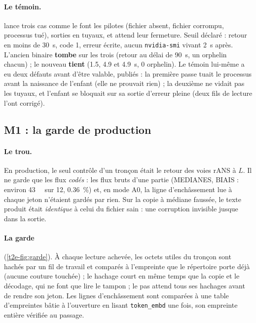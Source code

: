 \paragraph{Le témoin.}  lance trois cas comme le font les pilotes (fichier absent, fichier corrompu, processus tué), sorties en tuyaux, et attend leur fermeture. Seuil déclaré : retour en moins de \SI{30}{\second}, code 1, erreur écrite, aucun \texttt{nvidia-smi} vivant \SI{2}{\second} après. L'ancien binaire \textbf{tombe} sur les trois (retour au délai de \SI{90}{\second}, un orphelin chacun) ; le nouveau \textbf{tient} (\num{1.5}, \num{4.9} et \SI{4.9}{\second}, 0 orphelin). Le témoin lui-même a eu deux défauts avant d'être valable, publiés : la première passe tuait le processus avant la naissance de l'enfant (elle ne prouvait rien) ; la deuxième ne vidait pas les tuyaux, et l'enfant se bloquait sur sa sortie d'erreur pleine (deux fils de lecture l'ont corrigé).

\subsection{M1 : la garde de production}\label{t2e-sec:garde}

\paragraph{Le trou.} En production, le seul contrôle d'un tronçon était le retour des voies rANS à $L$. Il ne garde que les flux \emph{codés} : les flux bruts d'une partie (MEDIANES, BIAIS : environ \SI{43}{\kilo\octet} sur \SI{12}{\Mo}, \SI{0.36}{\percent}) et, en mode A0, la ligne d'enchâssement lue à chaque jeton n'étaient gardés par rien. Sur la copie à médiane faussée, le texte produit était \emph{identique} à celui du fichier sain : une corruption invisible jusque dans la sortie.

\paragraph{La garde} (\cref{t2e-fig:garde}). À chaque lecture achevée, les octets utiles du tronçon sont hachés par un fil de travail et comparés à l'empreinte que le répertoire porte déjà (aucune couture touchée) ; le hachage court en même temps que la copie et le décodage, qui ne font que lire le tampon ; le pas attend tous ses hachages avant de rendre son jeton. Les lignes d'enchâssement sont comparées à une table d'empreintes bâtie à l'ouverture en lisant \texttt{token\_embd} une fois, son empreinte entière vérifiée au passage.

